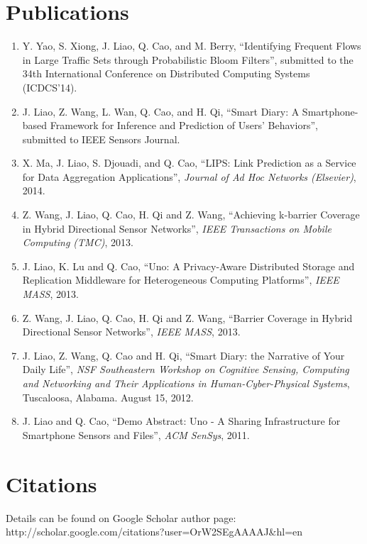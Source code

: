 \documentclass[margin, centered]{resume}
\begin{document}
\begin{resume}
    \section{\mysidestyle Publications}
    \begin{enumerate}
    \item Y. Yao, S. Xiong, J. Liao, Q. Cao, and M. Berry, ``Identifying Frequent Flows in Large Traffic Sets through Probabilistic Bloom Filters'', submitted to the 34th International Conference on Distributed Computing Systems (ICDCS’14). 
    \item J. Liao, Z. Wang, L. Wan, Q. Cao, and H. Qi, ``Smart Diary: A Smartphone-based Framework for Inference and Prediction of Users’ Behaviors'', submitted to IEEE Sensors Journal. 
    \item X. Ma, J. Liao, S. Djouadi, and Q. Cao, ``LIPS: Link Prediction as a Service for Data Aggregation Applications'', \emph{Journal of Ad Hoc Networks (Elsevier)}, 2014. 
    \item Z. Wang, J. Liao, Q. Cao, H. Qi and Z. Wang, ``Achieving k-barrier Coverage in Hybrid Directional Sensor Networks'', \emph{IEEE Transactions on Mobile Computing (TMC)}, 2013. 
    \item J. Liao, K. Lu and Q. Cao, ``Uno: A Privacy-Aware Distributed Storage and Replication Middleware for Heterogeneous Computing Platforms'', \emph{IEEE MASS}, 2013.  
    \item Z. Wang, J. Liao, Q. Cao, H. Qi and Z. Wang, ``Barrier Coverage in Hybrid Directional Sensor Networks'', \emph{IEEE MASS}, 2013. 
    \item J. Liao, Z. Wang, Q. Cao and H. Qi, ``Smart Diary: the Narrative of Your Daily Life'', \emph{NSF Southeastern Workshop on Cognitive Sensing, Computing and Networking and Their Applications in Human-Cyber-Physical Systems}, Tuscaloosa, Alabama. August 15, 2012.  
    \item J. Liao and Q. Cao, ``Demo Abstract: Uno - A Sharing Infrastructure for Smartphone Sensors and Files'', \emph{ACM SenSys}, 2011.
    \end{enumerate}

    \section{\mysidestyle Citations}
    Details can be found on Google Scholar author page: \\
    http://scholar.google.com/citations?user=OrW2SEgAAAAJ\&hl=en
    

\end{resume}
\end{document}
